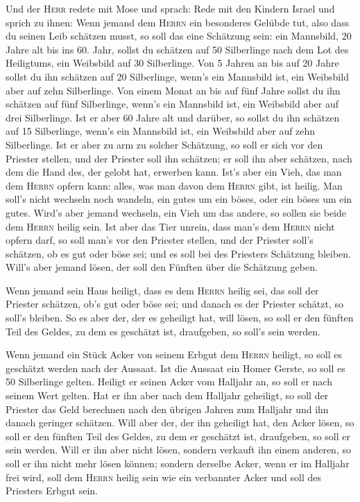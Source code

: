  Und der \textsc{Herr} redete mit Mose und sprach:
 Rede mit den Kindern Israel und sprich zu ihnen: Wenn
jemand dem \textsc{Herrn} ein besonderes Gelübde tut, also dass du
seinen Leib schätzen musst,  so soll das eine Schätzung
sein: ein Mannsbild, 20 Jahre alt bis ins 60. Jahr, sollst du schätzen
auf 50 Silberlinge nach dem Lot des Heiligtums,  ein
Weibsbild auf 30 Silberlinge.  Von 5 Jahren an bis auf 20
Jahre sollst du ihn schätzen auf 20 Silberlinge, wenn's ein Mannsbild
ist, ein Weibsbild aber auf zehn Silberlinge.  Von einem
Monat an bis auf fünf Jahre sollst du ihn schätzen auf fünf Silberlinge,
wenn's ein Mannsbild ist, ein Weibsbild aber auf drei Silberlinge.
 Ist er aber 60 Jahre alt und darüber, so sollst du ihn
schätzen auf 15 Silberlinge, wenn's ein Mannsbild ist, ein Weibsbild
aber auf zehn Silberlinge.  Ist er aber zu arm zu solcher
Schätzung, so soll er sich vor den Priester stellen, und der Priester
soll ihn schätzen; er soll ihn aber schätzen, nach dem die Hand des, der
gelobt hat, erwerben kann.  Ist's aber ein Vieh, das man
dem \textsc{Herrn} opfern kann: alles, was man davon dem \textsc{Herrn}
gibt, ist heilig.  Man soll's nicht wechseln noch
wandeln, ein gutes um ein böses, oder ein böses um ein gutes. Wird's
aber jemand wechseln, ein Vieh um das andere, so sollen sie beide dem
\textsc{Herrn} heilig sein.  Ist aber das Tier unrein,
dass man's dem \textsc{Herrn} nicht opfern darf, so soll man's vor den
Priester stellen,  und der Priester soll's schätzen, ob
es gut oder böse sei; und es soll bei des Priesters Schätzung bleiben.
 Will's aber jemand lösen, der soll den Fünften über die
Schätzung geben.

 Wenn jemand sein Haus heiligt, dass es dem
\textsc{Herrn} heilig sei, das soll der Priester schätzen, ob's gut oder
böse sei; und danach es der Priester schätzt, so soll's bleiben.
 So es aber der, der es geheiligt hat, will lösen, so
soll er den fünften Teil des Geldes, zu dem es geschätzt ist,
draufgeben, so soll's sein werden.

 Wenn jemand ein Stück Acker von seinem Erbgut dem
\textsc{Herrn} heiligt, so soll es geschätzt werden nach der Aussaat.
Ist die Aussaat ein Homer Gerste, so soll es 50 Silberlinge gelten.
 Heiligt er seinen Acker vom Halljahr an, so soll er nach
seinem Wert gelten.  Hat er ihn aber nach dem Halljahr
geheiligt, so soll der Priester das Geld berechnen nach den übrigen
Jahren zum Halljahr und ihn danach geringer schätzen. 
Will aber der, der ihn geheiligt hat, den Acker lösen, so soll er den
fünften Teil des Geldes, zu dem er geschätzt ist, draufgeben, so soll er
sein werden.  Will er ihn aber nicht lösen, sondern
verkauft ihn einem anderen, so soll er ihn nicht mehr lösen können;
 sondern derselbe Acker, wenn er im Halljahr frei wird,
soll dem \textsc{Herrn} heilig sein wie ein verbannter Acker und soll
des Priesters Erbgut sein.

